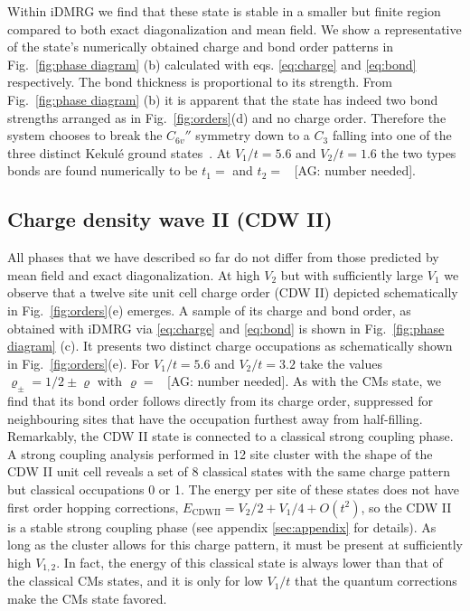 \documentclass[aps,prx,10pt,twocolumn,floatfix,superscriptaddress,showpacs,numerical,footinbib]{revtex4-1}
\newcommand{\noteAG}[1]{{\color{blue} [AG: #1]}}
\begin{document}
Within iDMRG we find that these state is stable in a smaller but finite region compared to both 
exact diagonalization and mean field.
%
We show a representative of the state's numerically obtained charge and bond order patterns in Fig.~\ref{fig:phase diagram} (b) 
calculated with eqs. \eqref{eq:charge} and \eqref{eq:bond} respectively.
%
The bond thickness is proportional to its strength.
%
From Fig.~\ref{fig:phase diagram} (b) it is apparent that the state has indeed two bond strengths arranged as in Fig.~\ref{fig:orders}(d) 
and no charge order.
%
Therefore the system chooses to break the $C_{6v}''$ symmetry down to a $C_{3}$
falling into one of the three distinct Kekul\'{e} ground states~\cite{WF10}.
%
At $V_{1}/t=5.6$ and $V_{2}/t=1.6$ the two types bonds are found numerically to be 
$t_{1}=$ and $t_{2}=$~\noteAG{number needed}.



\subsection{Charge density wave II (CDW II)}
%
All phases that we have described so far do not differ
from those predicted by mean field and exact diagonalization.
%
At high $V_{2}$ but with sufficiently large $V_{1}$ we observe that
a twelve site unit cell charge order (CDW II) depicted schematically in 
Fig.~\ref{fig:orders}(e) emerges.
%
A sample of its charge and bond order, as obtained with iDMRG via \eqref{eq:charge} and \eqref{eq:bond} is
shown in Fig.~\ref{fig:phase diagram} (c).
%
It presents two distinct charge occupations as schematically shown in Fig.~\ref{fig:orders}(e).
%
For $V_{1}/t=5.6$ and $V_{2}/t=3.2$ 
take the values $\varrho_{\pm}=1/2\pm\varrho$ with $\varrho=$~\noteAG{number needed}.
%
As with the CMs state, we find that its bond order follows directly from its charge order, suppressed for neighbouring sites that have
the occupation furthest away from half-filling.\\
%

%
Remarkably, the CDW II state is connected to a classical strong coupling phase.
%
A strong coupling analysis performed in 12 site cluster with the shape of the CDW II 
unit cell reveals a set of 8 classical states with the same charge pattern but classical occupations 0 or 1. 
%
The energy per site of these states does not have first order hopping corrections,
$E_{\mathrm{CDW II}} = V_2/2+V_1/4 + O(t^2)$, so the CDW II is a stable strong coupling phase 
(see appendix \ref{sec:appendix} for details). 
%
As long as the cluster allows for this charge pattern, it must be present at sufficiently high $V_{1,2}$.
%
In fact, the energy of this classical state is always lower than that of the classical CMs states, 
and it is only for low $V_1/t$ that the quantum corrections make the CMs state favored. 
%
\end{document}
